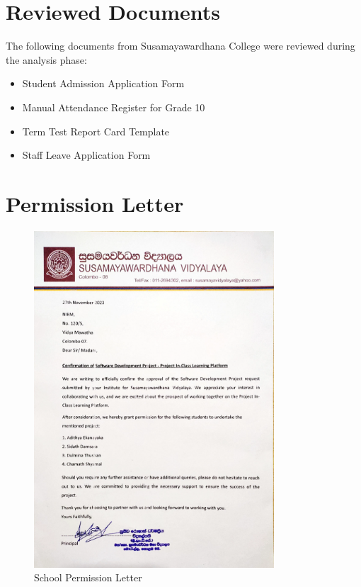 \documentclass[12pt,a4paper]{report}
\begin{document}
\section{Reviewed Documents}
The following documents from Susamayawardhana College were reviewed during the analysis phase:
\begin{itemize}
    \item Student Admission Application Form
    \item Manual Attendance Register for Grade 10
    \item Term Test Report Card Template
    \item Staff Leave Application Form
\end{itemize}

\section{Permission Letter}

\begin{figure}[htbp]
    \centering
    \includegraphics[width=0.8\textwidth]{school-permission-letter.png}
    \caption{School Permission Letter}
    \label{fig:permission-letter}
\end{figure}

\end{document}
